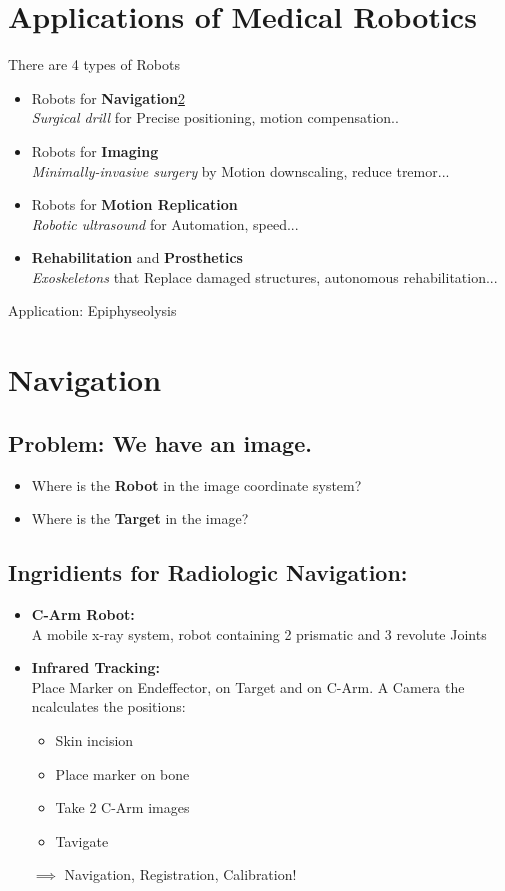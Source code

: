 \documentclass{exerciseBlue}
\begin{document}
	\section{Applications of Medical Robotics}
	 There are 4 types of Robots
	  \begin{itemize}
	  	\item Robots for \textbf{Navigation}\ref{sec:navigation}\\
	  	\textit{Surgical drill} for Precise positioning, motion compensation..
	  	\item Robots for \textbf{Imaging}\\
	  	\textit{Minimally-invasive surgery} by Motion downscaling, reduce tremor...
		\item Robots for \textbf{Motion Replication}\\
		\textit{Robotic ultrasound} for Automation, speed...
		\item \textbf{Rehabilitation} and \textbf{Prosthetics}\\
		\textit{Exoskeletons} that Replace damaged structures, autonomous rehabilitation...
	  \end{itemize}
	  Application: Epiphyseolysis
  
  \section{Navigation}\label{sec:navigation}
  \subsection{Problem: We have an image.}
  \begin{itemize}
  	\item  Where is the \textbf{Robot} in the image coordinate system?
  	\item Where is the \textbf{Target} in the image?
  \end{itemize}  
\subsection{Ingridients for Radiologic Navigation:}
\begin{itemize}
	\item \textbf{C-Arm Robot:}\\
	A mobile x-ray system, robot containing 2 prismatic and 3 revolute Joints
	\item \textbf{Infrared Tracking:}\\
	Place Marker on Endeffector, on Target and on C-Arm. A Camera the ncalculates the positions:
	\begin{itemize}
		\item Skin incision
		\item Place marker on bone
		\item Take 2 C-Arm images
		\item Tavigate
	\end{itemize}
	\item[$\implies$] Navigation, Registration, Calibration!
\end{itemize}
\end{document}
